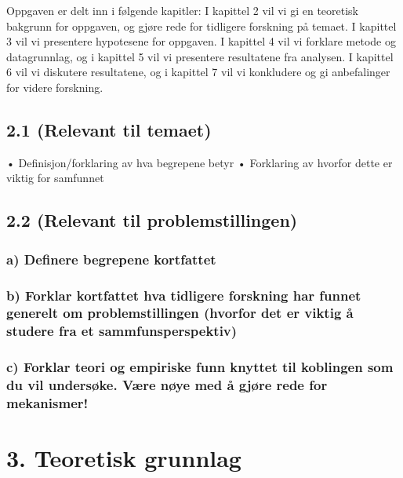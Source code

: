 \documentclass[
  11pt,
  a4paper,
  DIV=11,
  numbers=noendperiod]{scrartcl}
\begin{document}
Oppgaven er delt inn i følgende kapitler: I kapittel 2 vil vi gi en
teoretisk bakgrunn for oppgaven, og gjøre rede for tidligere forskning
på temaet. I kapittel 3 vil vi presentere hypotesene for oppgaven. I
kapittel 4 vil vi forklare metode og datagrunnlag, og i kapittel 5 vil
vi presentere resultatene fra analysen. I kapittel 6 vil vi diskutere
resultatene, og i kapittel 7 vil vi konkludere og gi anbefalinger for
videre forskning.

\clearpage

\subsection{2.1 (Relevant til temaet)}\label{relevant-til-temaet}

• Definisjon/forklaring av hva begrepene betyr • Forklaring av hvorfor
dette er viktig for samfunnet

\subsection{2.2 (Relevant til
problemstillingen)}\label{relevant-til-problemstillingen}

\subsubsection{a) Definere begrepene
kortfattet}\label{a-definere-begrepene-kortfattet}

\subsubsection{b) Forklar kortfattet hva tidligere forskning har funnet
generelt om problemstillingen (hvorfor det er viktig å studere fra et
sammfunsperspektiv)}\label{b-forklar-kortfattet-hva-tidligere-forskning-har-funnet-generelt-om-problemstillingen-hvorfor-det-er-viktig-uxe5-studere-fra-et-sammfunsperspektiv}

\subsubsection{c) Forklar teori og empiriske funn knyttet til koblingen
som du vil undersøke. Være nøye med å gjøre rede for
mekanismer!}\label{c-forklar-teori-og-empiriske-funn-knyttet-til-koblingen-som-du-vil-undersuxf8ke.-vuxe6re-nuxf8ye-med-uxe5-gjuxf8re-rede-for-mekanismer}

\section{3. Teoretisk grunnlag}\label{teoretisk-grunnlag}
\end{document}
